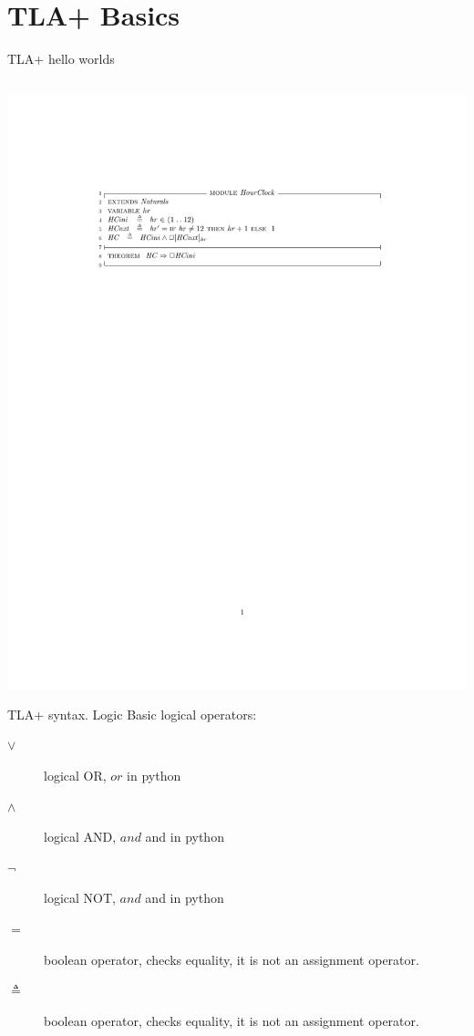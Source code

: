 \documentclass[12pt]{beamer}
\begin{document}
  \section{TLA+ Basics}
  \begin{frame}{TLA+ hello worlds}
    \begin{center}
      \inputminted[linenos,fontsize=\scriptsize]{tla}{figures/hourclock.tla}
      \includegraphics[scale=0.8]{figures/hourclock.pdf}
    \end{center}
  \end{frame}
  \begin{frame}{TLA+ syntax. Logic}
      Basic logical operators:
      \begin{description}
        \item[$\lor$] logical OR, $or$ in python
        \item[$\land$] logical AND, $and$ and in python
        \item[$\lnot$] logical NOT, $and$ and in python
        \item[$=$] boolean operator, checks equality, it is not an assignment operator.
        \item[$\triangleq$] boolean operator, checks equality, it is not an assignment operator.
      \end{description}
  \end{frame}
\end{document}

